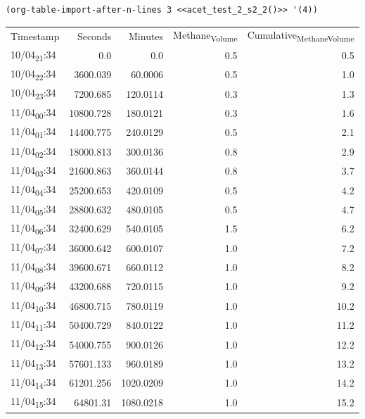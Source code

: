 \documentclass[11pt]{article}
\begin{document}
\begin{verbatim}
(org-table-import-after-n-lines 3 <<acet_test_2_s2_2()>> '(4))
\end{verbatim}

\begin{center}
\begin{tabular}{lrrrr}
Timestamp & Seconds & Minutes & Methane\textsubscript{Volume} & Cumulative\textsubscript{Methane}\textsubscript{Volume}\\[0pt]
10/04\textsubscript{21}:34 & 0.0 & 0.0 & 0.5 & 0.5\\[0pt]
10/04\textsubscript{22}:34 & 3600.039 & 60.0006 & 0.5 & 1.0\\[0pt]
10/04\textsubscript{23}:34 & 7200.685 & 120.0114 & 0.3 & 1.3\\[0pt]
11/04\textsubscript{00}:34 & 10800.728 & 180.0121 & 0.3 & 1.6\\[0pt]
11/04\textsubscript{01}:34 & 14400.775 & 240.0129 & 0.5 & 2.1\\[0pt]
11/04\textsubscript{02}:34 & 18000.813 & 300.0136 & 0.8 & 2.9\\[0pt]
11/04\textsubscript{03}:34 & 21600.863 & 360.0144 & 0.8 & 3.7\\[0pt]
11/04\textsubscript{04}:34 & 25200.653 & 420.0109 & 0.5 & 4.2\\[0pt]
11/04\textsubscript{05}:34 & 28800.632 & 480.0105 & 0.5 & 4.7\\[0pt]
11/04\textsubscript{06}:34 & 32400.629 & 540.0105 & 1.5 & 6.2\\[0pt]
11/04\textsubscript{07}:34 & 36000.642 & 600.0107 & 1.0 & 7.2\\[0pt]
11/04\textsubscript{08}:34 & 39600.671 & 660.0112 & 1.0 & 8.2\\[0pt]
11/04\textsubscript{09}:34 & 43200.688 & 720.0115 & 1.0 & 9.2\\[0pt]
11/04\textsubscript{10}:34 & 46800.715 & 780.0119 & 1.0 & 10.2\\[0pt]
11/04\textsubscript{11}:34 & 50400.729 & 840.0122 & 1.0 & 11.2\\[0pt]
11/04\textsubscript{12}:34 & 54000.755 & 900.0126 & 1.0 & 12.2\\[0pt]
11/04\textsubscript{13}:34 & 57601.133 & 960.0189 & 1.0 & 13.2\\[0pt]
11/04\textsubscript{14}:34 & 61201.256 & 1020.0209 & 1.0 & 14.2\\[0pt]
11/04\textsubscript{15}:34 & 64801.31 & 1080.0218 & 1.0 & 15.2\\[0pt]

\end{tabular}
\end{center}
\end{document}
